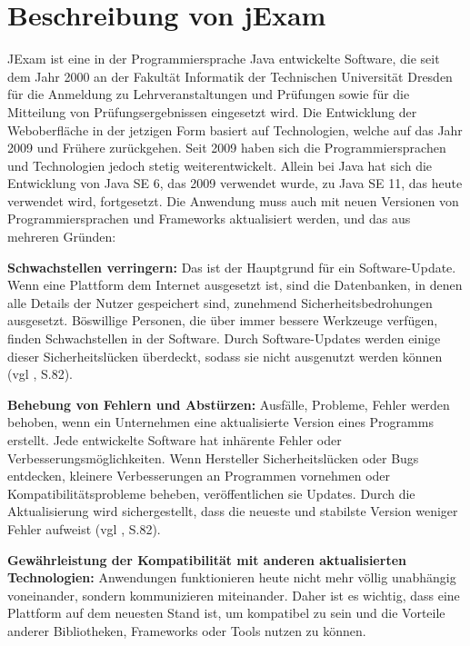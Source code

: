 \section{Beschreibung von jExam}

JExam ist eine in der Programmiersprache Java entwickelte Software,
die seit dem Jahr 2000 an der Fakult\"at Informatik der Technischen
Universit\"at Dresden für die Anmeldung zu Lehrveranstaltungen und
Pr\"ufungen sowie für die Mitteilung von Pr\"ufungsergebnissen eingesetzt
wird. Die Entwicklung der Weboberfläche in der jetzigen Form basiert
auf Technologien, welche auf das Jahr 2009 und Frühere zur\"uckgehen.
Seit 2009 haben sich die Programmiersprachen und Technologien jedoch
stetig weiterentwickelt. Allein bei Java hat sich die Entwicklung von
Java SE 6, das 2009 verwendet wurde, zu Java SE 11, das heute verwendet
wird, fortgesetzt. Die Anwendung muss auch mit neuen Versionen von
Programmiersprachen und Frameworks aktualisiert werden, und das aus
mehreren Gründen:


\textbf{Schwachstellen verringern:} Das ist der Hauptgrund für ein
Software-Update. Wenn eine Plattform dem Internet ausgesetzt ist,
sind die Datenbanken, in denen alle Details der Nutzer gespeichert
sind, zunehmend Sicherheitsbedrohungen ausgesetzt. Böswillige
Personen, die über immer bessere Werkzeuge verfügen, finden
Schwachstellen in der Software.  Durch Software-Updates werden einige
dieser Sicherheitslücken überdeckt, sodass sie nicht ausgenutzt werden
können (vgl \cite{10.1145/605466.605479}, S.82).

\textbf{Behebung von Fehlern und Abstürzen:} Ausfälle, Probleme, Fehler
werden behoben, wenn ein Unternehmen eine aktualisierte Version eines
Programms erstellt. Jede entwickelte Software hat inhärente Fehler
oder Verbesserungsmöglichkeiten. Wenn Hersteller Sicherheitslücken
oder Bugs entdecken, kleinere Verbesserungen an Programmen vornehmen
oder Kompatibilitätsprobleme beheben, veröffentlichen sie Updates.
Durch die Aktualisierung wird sichergestellt, dass die neueste und
stabilste Version weniger Fehler aufweist (vgl \cite{10.1145/605466.605479}, S.82).

\textbf{Gewährleistung der Kompatibilität mit anderen aktualisierten
Technologien:} Anwendungen funktionieren heute nicht mehr völlig unabhängig
voneinander, sondern kommunizieren miteinander. Daher ist es wichtig, dass eine
Plattform auf dem neuesten Stand ist, um kompatibel zu sein und die
Vorteile anderer Bibliotheken, Frameworks oder Tools nutzen zu können.


